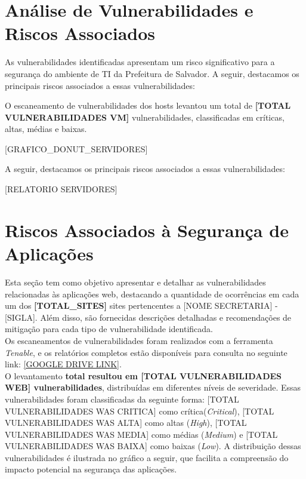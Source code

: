 \documentclass[a4paper,12pt]{article}
\begin{document}
\section{Análise de Vulnerabilidades e Riscos Associados}
As vulnerabilidades identificadas apresentam um risco significativo para a segurança do ambiente de TI da Prefeitura de Salvador. A seguir, destacamos os principais riscos associados a essas vulnerabilidades:

O escaneamento de vulnerabilidades dos hosts levantou um total de \textbf{[TOTAL VULNERABILIDADES VM]} vulnerabilidades, classificadas em críticas, altas, médias e baixas.

    [GRAFICO_DONUT_SERVIDORES]
    \FloatBarrier

A seguir, destacamos os principais riscos associados a essas vulnerabilidades: 

[RELATORIO SERVIDORES]

\section{Riscos Associados à Segurança de Aplicações}

Esta seção tem como objetivo apresentar e detalhar as vulnerabilidades relacionadas às aplicações web, destacando a quantidade de ocorrências em cada um dos \textbf{[TOTAL_SITES]} sites pertencentes a [NOME SECRETARIA] - [SIGLA]. Além disso, são fornecidas descrições detalhadas e recomendações de mitigação para cada tipo de vulnerabilidade identificada.\\

Os escaneamentos de vulnerabilidades foram realizados com a ferramenta \textit{Tenable}, e os relatórios completos estão disponíveis para consulta no seguinte link: \url{[GOOGLE DRIVE LINK]}.\\

O levantamento \textbf{total resultou em [TOTAL VULNERABILIDADES WEB] vulnerabilidades}, distribuídas em diferentes níveis de severidade. Essas vulnerabilidades foram classificadas da seguinte forma: [TOTAL VULNERABILIDADES WAS CRITICA] como crítica(\textit{Critical}), [TOTAL VULNERABILIDADES WAS ALTA] como altas (\textit{High}), [TOTAL VULNERABILIDADES WAS MEDIA] como médias (\textit{Medium}) e [TOTAL VULNERABILIDADES WAS BAIXA] como baixas (\textit{Low}). A distribuição dessas vulnerabilidades é ilustrada no gráfico a seguir, que facilita a compreensão do impacto potencial na segurança das aplicações.
\end{document}

